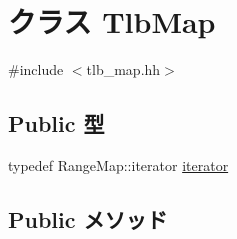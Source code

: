 \hypertarget{classSparcISA_1_1TlbMap}{
\section{クラス TlbMap}
\label{classSparcISA_1_1TlbMap}
}


{\ttfamily \#include $<$tlb\_\-map.hh$>$}\subsection*{Public 型}
\begin{DoxyCompactItemize}
\item 
typedef RangeMap::iterator \hyperlink{classSparcISA_1_1TlbMap_ae61c5513b9ac04615ba7927f47c3ec69}{iterator}
\end{DoxyCompactItemize}
\subsection*{Public メソッド}
